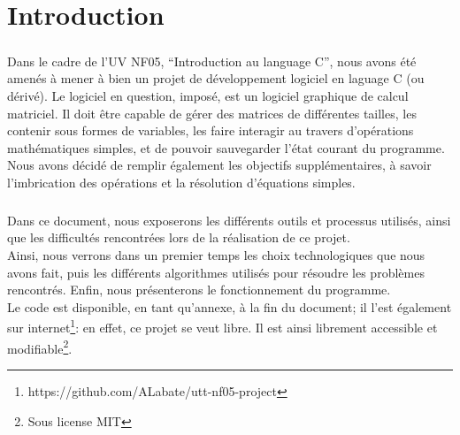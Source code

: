 \chapter{Introduction}
    \paragraph{}
        Dans le cadre de l'UV NF05, ``Introduction au language C'', nous avons été amenés à mener à bien un projet de développement logiciel en laguage C (ou dérivé).
        Le logiciel en question, imposé, est un logiciel graphique de calcul matriciel. Il doit être capable de gérer des matrices de différentes tailles,
        les contenir sous formes de variables, les faire interagir au travers d'opérations mathématiques simples, et de pouvoir sauvegarder l'état courant du programme.
        Nous avons décidé de remplir également les objectifs supplémentaires, à savoir l'imbrication des opérations et la résolution d'équations simples.
    
    \paragraph{}
        Dans ce document, nous exposerons les différents outils et processus utilisés, ainsi que les difficultés rencontrées lors de la réalisation de ce
        projet.\\ 
        Ainsi, nous verrons dans un premier temps les choix technologiques que nous avons fait, puis les différents algorithmes utilisés pour résoudre
        les problèmes rencontrés. Enfin, nous présenterons le fonctionnement du programme.\\
        Le code est disponible, en tant qu'annexe, à la fin du document; il l'est également sur internet\footnote{https://github.com/ALabate/utt-nf05-project}: en effet, ce projet se veut libre. Il est ainsi librement accessible et modifiable\footnote{Sous license MIT}.